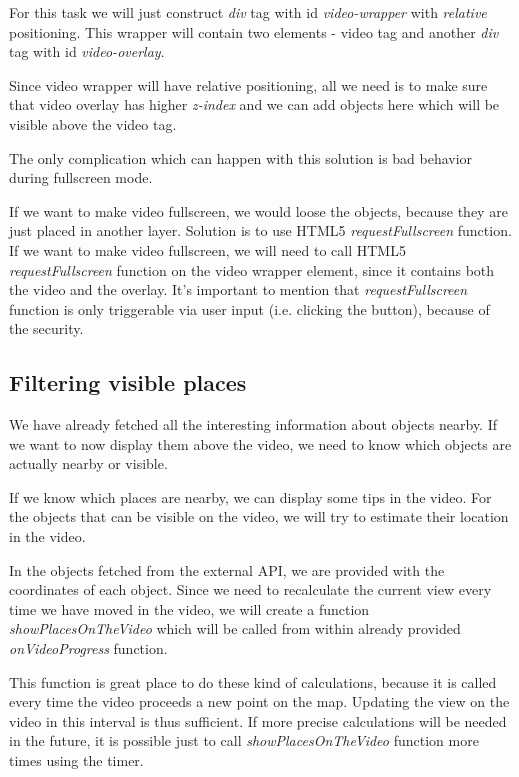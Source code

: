 \documentclass[journal]{IEEEtran}
\begin{document}
For this task we will just construct \textit{div} tag with id \textit{video-wrapper} with \textit{relative} positioning. This wrapper will contain two elements - video tag and another \textit{div} tag with id \textit{video-overlay}.

Since video wrapper will have relative positioning, all we need is to make sure that video overlay has higher \textit{z-index} and we can add objects here which will be visible above the video tag.

The only complication which can happen with this solution is bad behavior during fullscreen mode.

If we want to make video fullscreen, we would loose the objects, because they are just placed in another layer. Solution is to use HTML5 \textit{requestFullscreen} function. If we want to make video fullscreen, we will need to call HTML5 \textit{requestFullscreen} function on the video wrapper element, since it contains both the video and the overlay. It's important to mention that \textit{requestFullscreen} function is only triggerable via user input (i.e. clicking the button), because of the security.

\subsection{Filtering visible places}

We have already fetched all the interesting information about objects nearby. If we want to now display them above the video, we need to know which objects are actually nearby or visible.

If we know which places are nearby, we can display some tips in the video. For the objects that can be visible on the video, we will try to estimate their location in the video.

In the objects fetched from the external API, we are provided with the coordinates of each object. Since we need to recalculate the current view every time we have moved in the video, we will create a function \textit{showPlacesOnTheVideo} which will be called from within already provided \textit{onVideoProgress} function.

	This function is great place to do these kind of calculations, because it is called every time the video proceeds a new point on the map. Updating the view on the video in this interval is thus sufficient. If more precise calculations will be needed in the future, it is possible just to call \textit{showPlacesOnTheVideo} function more times using the timer.
	
\end{document}
